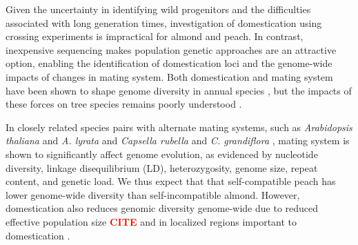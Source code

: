 \documentclass[12pt]{article}
\newcommand{\citex}{\textcolor{red}{\bf CITE }}
\begin{document}
%
Given the uncertainty in identifying wild progenitors and the difficulties associated with long generation times, investigation of domestication using crossing experiments is impractical for almond and peach.
%
In contrast, inexpensive sequencing makes population genetic approaches \citep[c.f.][]{ross2007plant} are an attractive option, enabling the identification of domestication loci and the genome-wide impacts of changes in mating system.   
%
Both domestication and mating system have been shown to shape genome diversity in annual species \citep{glemin2006impact, doebley2006molecular, slotte2013capsella}, but the impacts of these forces on tree species remains poorly understood \citep{mckey2010evolutionary, miller2011forest}.

In closely related species pairs with alternate mating systems, such as \emph{Arabidopsis thaliana} and \emph{A. lyrata} and \emph{Capsella rubella} and \emph{C. grandiflora} \citep{slotte2013capsella}, mating system is shown to significantly affect genome evolution, as evidenced by nucleotide diversity, linkage disequilibrium (LD), heterozygosity, genome size, repeat content, and genetic load.
%
We thus expect that that self-compatible peach has lower genome-wide diversity than self-incompatible almond.
%
However, domestication also reduces genomic diversity genome-wide due to reduced effective population size \citex and in localized regions important to domestication \citep{glemin2006impact, doebley2006molecular}. 
%
%
%
%
\end{document}

